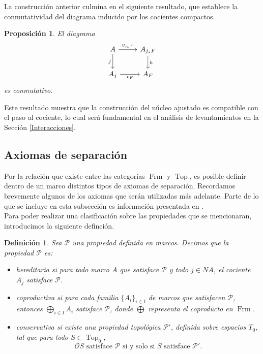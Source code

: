 \documentclass[12pt]{article}
\newtheorem{dfn}[thm]{Definición}
\newtheorem{prop}[thm]{Proposición}
\DeclareMathOperator{\Frm}{Frm}
\DeclareMathOperator{\Top}{Top}
\begin{document}
La construcción anterior culmina en el siguiente resultado, que establece la conmutatividad del diagrama inducido por los cocientes compactos.
\begin{prop}\label{VFsquare}
El diagrama
\begin{equation}\label{Cuadrado}
    \begin{tikzcd}
	A & {A_{j_*F}} \\
	{A_j} & {A_F}
	\arrow["{v_{j_*F}}", from=1-1, to=1-2]
	\arrow["j"', from=1-1, to=2-1]
	\arrow["h", from=1-2, to=2-2]
	\arrow["{v_F}"', from=2-1, to=2-2]
\end{tikzcd}\end{equation}
es conmutativo.
\end{prop}

Este resultado muestra que la construcción del núcleo ajustado es compatible con el paso al cociente, lo cual será fundamental en el análisis de 
levantamientos en la Sección \ref{Interacciones}.

\subsection{Axiomas de separación}
Por la relación que existe entre las categorías $\Frm$ y $\Top$, es posible definir dentro de un marco distintos tipos de axiomas de separación.
Recordamos brevemente algunos de los axiomas que serán utilizadas más adelante. Parte de lo que se incluye en esta subsección es información presentada en \cite{picado2021separation}.\\

Para poder realizar una clasificación sobre las propiedades que se mencionaran, introducimos la siguiente definción.

\begin{dfn}\label{PropFrm}
Sea $\mathcal{P}$ una propiedad definida en marcos. Decimos que la propiedad $\mathcal{P}$ es:
\begin{itemize}
\item \emph{hereditaria} si para todo marco $A$ que satisface $\mathcal{P}$ y todo $j\in NA$, el cociente $A_j$ satisface $\mathcal{P}$.
\item \emph{coproductiva} si para cada familia $\{A_i\}_{i\in I}$ de marcos que satisfacen $\mathcal{P}$, entonces $\bigoplus_{i\in I}A_i$ satisface $\mathcal{P}$, donde $\bigoplus$ representa el coproducto en $\Frm$.
\item \emph{conservativa} si existe una propiedad topológica $\mathcal{P}'$, definida sobre espacios $T_0$, tal que para todo $S\in \Top_0$,
\[
\mathcal{O}S\text{ satisface }\mathcal{P}\text{ si y solo si }S\text{ satisface }\mathcal{P}'.
\]
\end{itemize}
\end{dfn}
\end{document}
